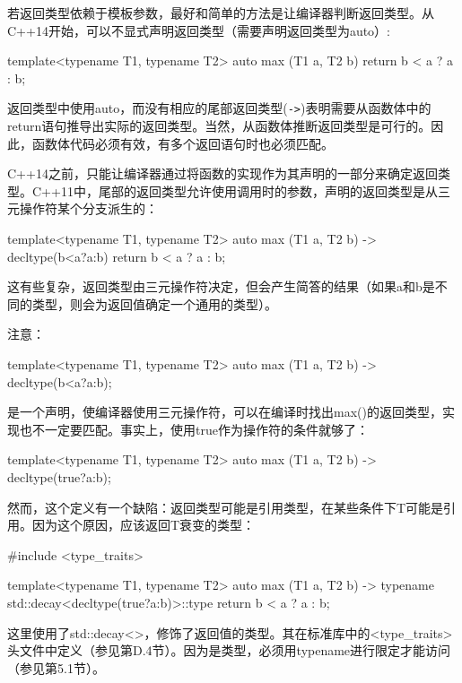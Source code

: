 若返回类型依赖于模板参数，最好和简单的方法是让编译器判断返回类型。从C++14开始，可以不显式声明返回类型（需要声明返回类型为auto）:

\begin{cpp}
template<typename T1, typename T2>
auto max (T1 a, T2 b) {
	return b < a ? a : b;
}
\end{cpp}

返回类型中使用auto，而没有相应的尾部返回类型(\texttt{->})表明需要从函数体中的return语句推导出实际的返回类型。当然，从函数体推断返回类型是可行的。因此，函数体代码必须有效，有多个返回语句时也必须匹配。

C++14之前，只能让编译器通过将函数的实现作为其声明的一部分来确定返回类型。C++11中，尾部的返回类型允许使用调用时的参数，声明的返回类型是从三元操作符某个分支派生的：

\begin{cpp}
template<typename T1, typename T2>
auto max (T1 a, T2 b) -> decltype(b<a?a:b) {
	return b < a ? a : b;
}
\end{cpp}

这有些复杂，返回类型由三元操作符决定，但会产生简答的结果（如果a和b是不同的类型，则会为返回值确定一个通用的类型）。

注意：

\begin{cpp}
template<typename T1, typename T2>
auto max (T1 a, T2 b) -> decltype(b<a?a:b);
\end{cpp}

是一个声明，使编译器使用三元操作符，可以在编译时找出max()的返回类型，实现也不一定要匹配。事实上，使用true作为操作符的条件就够了：

\begin{cpp}
template<typename T1, typename T2>
auto max (T1 a, T2 b) -> decltype(true?a:b);
\end{cpp}

然而，这个定义有一个缺陷：返回类型可能是引用类型，在某些条件下T可能是引用。因为这个原因，应该返回T衰变的类型：

\begin{cpp}
#include <type_traits>

template<typename T1, typename T2>
auto max (T1 a, T2 b) -> typename std::decay<decltype(true?a:b)>::type {
	return b < a ? a : b;
}
\end{cpp}

这里使用了std::decay<>，修饰了返回值的类型。其在标准库中的<type\_traits>头文件中定义（参见第D.4节）。因为是类型，必须用typename进行限定才能访问（参见第5.1节）。

